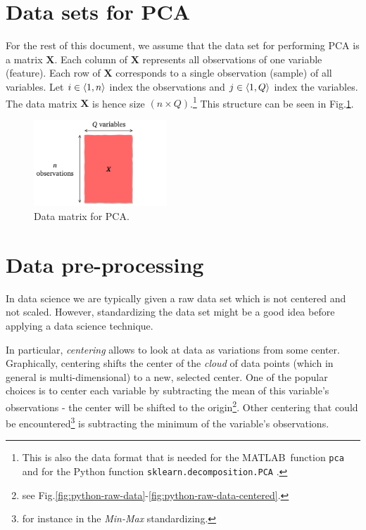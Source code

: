 \documentclass[10pt,twocolumn]{article}
\begin{document}
\section{Data sets for PCA}

For the rest of this document, we assume that the data set for performing PCA is a matrix $\bm{X}$. Each column of $\bm{X}$ represents all observations of one variable (feature). Each row of $\bm{X}$ corresponds to a single observation (sample) of all variables. Let $i \in \braket{1, n}$ index the observations and $j \in \braket{1, Q}$ index the variables. The data matrix $\bm{X}$ is hence size $(n \times Q)$.\footnote{This is also the data format that is needed for the MATLAB\textregistered \, function \texttt{pca} \cite{Matlab-pca} and for the Python function \texttt{sklearn.decomposition.PCA} \cite{Python-pca}.} This structure can be seen in Fig.\ref{fig:data-matrix}.


\begin{figure}[H]
\centering\includegraphics[width=5cm]{data-set-PCA.png}
\caption{Data matrix for PCA.}
\label{fig:data-matrix}
\end{figure}

\section{Data pre-processing}

In data science we are typically given a raw data set which is not centered and not scaled. However, standardizing the data set might be a good idea before applying a data science technique.

In particular, \textit{centering} allows to look at data as variations from some center. Graphically, centering shifts the center of the \textit{cloud} of data points (which in general is multi-dimensional) to a new, selected center. One of the popular choices is to center each variable by subtracting the mean of this variable's observations - the center will be shifted to the origin\footnote{see Fig.\ref{fig:python-raw-data}-\ref{fig:python-raw-data-centered}.}.
Other centering that could be encountered\footnote{for instance in the \textit{Min-Max} standardizing.} is subtracting the minimum of the variable's observations.
\end{document}
